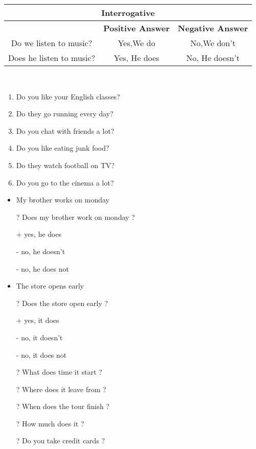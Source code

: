 \documentclass{elegantbook}
\begin{document}
        \begin{tabular}{|c|c|c|}
            \hline
            \multicolumn{3}{|c|}{Interrogative}\\
            \hline
            &\textbf{Positive Answer}&\textbf{Negative Answer}\\
            \hline
            Do we listen to music?&Yes,We do&No,We don't\\
            \hline
            Does he listen to music?&Yes, He does&No, He doesn't\\
            \hline
        \end{tabular}
        \\
        \begin{example}
            \begin{enumerate}
                \item Do you like your English classes?
                \item Do they go running every day?
                \item Do you chat with friends a lot?
                \item Do you like eating junk food?
                \item Do they watch football on TV?
                \item Do you go to the cinema a lot?
            \end{enumerate}
        \end{example}

        \begin{example}
            \begin{itemize}
                \item My brother works on monday
                \item [?] Does my brother work on monday ?
                \item [+]yes, he does
                \item [-]no, he doesn't
                \item [-]no, he does not
                \item The store opens early
                \item [?] Does the store open early ?
                \item [+]yes, it does
                \item [-]no, it doesn't
                \item [-]no, it does not
                \item [?]What does time it start ?
                \item [?]Where does it leave from ?
                \item [?]When does the tour finish ?
                \item [?]How much does it ?
                \item [?]Do you take credit cards ?
            \end{itemize}
        \end{example}
\end{document}
